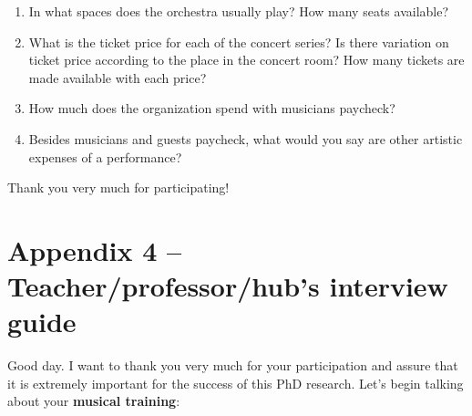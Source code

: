 \documentclass[a4paper, 12pt, openright, oneside, german, french, brazil, english]{abntex2}
\begin{document}
\begin{enumerate}
          \vspace{0.8cm}
          [\textbf{If it is an orchestra:}]
        \item In what spaces does the orchestra usually play? How many seats available?
        \item What is the ticket price for each of the concert series? Is there variation on ticket price according to the place in the concert room? How many tickets are made available with each price?
        \item How much does the organization spend with musicians paycheck?
        \item Besides musicians and guests paycheck, what would you say are other artistic expenses of a performance?

        \end{enumerate}

        Thank you very much for participating!
        


        \newpage

        \chapter*[Interview guide]{Appendix 4 -- Teacher/professor/hub's interview guide}

        Good day. I want to thank you very much for your participation and assure that it is extremely important for the success of this PhD research. Let's begin talking about your \textbf{musical training}:
\end{document}
